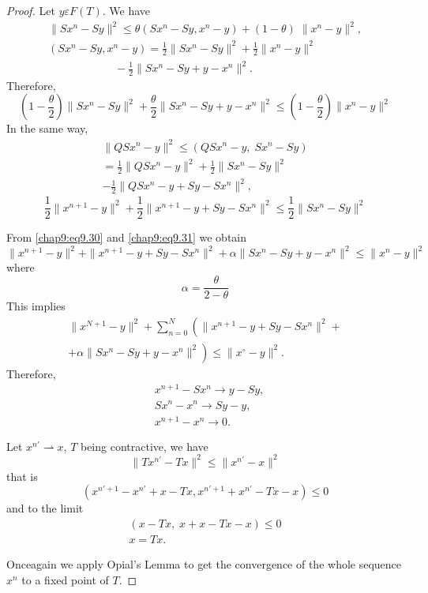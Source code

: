 \begin{proof}
Let $y\varepsilon F(T)$. We have 
\begin{gather*}
\parallel Sx^n-Sy\parallel^2\leq\theta(Sx^n-Sy,x^n-y)+(1-\theta)\;
\parallel x^n-y\parallel^2,\\
(Sx^n-Sy,x^n-y)=\frac{1}{2}\parallel Sx^n-Sy\parallel^2+\frac{1}{2}
\parallel x^n-y\parallel^2\\
\qquad\qquad\qquad-\frac{1}{2}\parallel Sx^n-Sy+y-x^n \parallel^2.
\end{gather*}
Therefore,
\begin{equation}\label{chap9:eq9.30}
(1-\frac{\theta}{2})\parallel Sx^n-Sy\parallel^2+\frac{\theta}{2}
\parallel Sx^n-Sy+y-x^n\parallel^2\leq(1-\frac{\theta}{2})\parallel
x^n-y\parallel^2 
\end{equation}
In the same way,
\begin{multline*}
\parallel QSx^n-y\parallel^2\leq (QSx^n-y, \;Sx^n-Sy)\\
=\frac{1}{2}\parallel QSx^n-y\parallel^2+\frac{1}{2}\parallel Sx^n-
Sy\parallel^2\\
-\frac{1}{2}\parallel QSx^n-y+Sy-Sx^n\parallel^2,
\end{multline*}
\ie \pageoriginale
\begin{equation}\label{chap9:eq9.31}
\frac{1}{2}\parallel x^{n+1}-y\parallel^2+\frac{1}{2}\parallel x^{n+1}
-y+Sy-Sx^n\parallel^2\leq\frac{1}{2}\parallel Sx^n-Sy\parallel^2
\end{equation}

From \eqref{chap9:eq9.30} and \eqref{chap9:eq9.31} we obtain 
$$
\parallel x^{n+1}-y\parallel^2+\parallel x^{n+1}-y+Sy-Sx^n\parallel^2
+\alpha\parallel Sx^n-Sy+y-x^n\parallel^2\leq\parallel
x^n-y\parallel^2 
$$
where
$$
\alpha =\frac{\theta}{2-\theta}
$$
This implies
\begin{align*}
\parallel x^{N+1}-y\parallel^2+\sum\limits_{n=0}^N\left(\parallel
x^{n+1}-y+Sy-Sx^n\parallel^2+\right.\\
\left.+\alpha\parallel Sx^n-Sy+y-x^n\parallel^2\right)\leq\parallel x^\circ
-y\parallel^2.
\end{align*}
Therefore,
\begin{align*}
&x^{n+1}-Sx^n\to y-Sy,\\
&Sx^n-x^n\to Sy-y,\\
&x^{n+1}-x^n\to 0.
\end{align*}

Let $x^{n'}\rightharpoonup x$, $T$ being contractive, we have 
$$
\parallel Tx^{n'}-Tx\parallel^2 \leq\parallel x^{n'}-x\parallel^2
$$
that is 
$$
\left(x^{n'+1}-x^{n'}+x-Tx, x^{n'+1}+x^{n'}-Tx-x\right)\leq 0
$$
and to the limit 
\begin{gather*}
(x-Tx,\;x+x-Tx-x)\leq 0\\
x=Tx.
\end{gather*}

Once\pageoriginale again we apply Opial's Lemma to get the convergence
of the whole sequence $x^n$ to a fixed point of $T$.
\end{proof}

